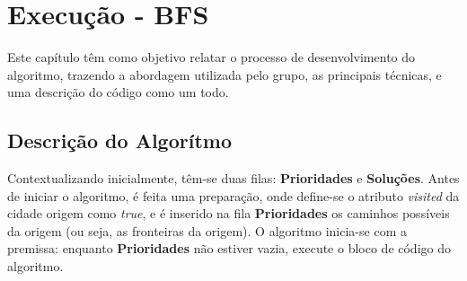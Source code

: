 \chapter[Execução - BFS]{Execução - BFS}

Este capítulo têm como objetivo relatar o processo de desenvolvimento do algoritmo, trazendo a abordagem utilizada pelo grupo, as principais técnicas, e uma descrição do código como um todo.

\section{Descrição do Algorítmo}

Contextualizando inicialmente, têm-se duas filas: \textbf{Prioridades} e \textbf{Soluções}. Antes de iniciar o algoritmo, é feita uma preparação, onde define-se o atributo \textit{visited} da cidade origem como \textit{true}, e é inserido na fila \textbf{Prioridades} os caminhos possíveis da origem (ou seja, as fronteiras da origem). O algoritmo inicia-se com a premissa: enquanto \textbf{Prioridades} não estiver vazia, execute o bloco de código do algoritmo.

